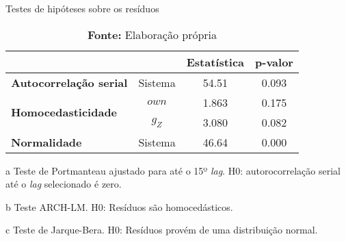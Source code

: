 \begin{table}[htb]
\centering
\caption{Testes de hipóteses sobre os resíduos}
\label{testes_resduos}
	\begin{threeparttable}
\begin{tabular}{l|c|c|c}
\hline
\multicolumn{2}{l|}{} & \textbf{Estatística} & \textbf{p-valor} \\ \hline
\textbf{Autocorrelação serial}\tnote{a} & Sistema & 54.51 & 0.093 \\ \hline
\multirow{2}{*}{\textbf{Homocedasticidade}\tnote{b}} & $own$ & 1.863 & 0.175 \\ \cline{2-4} 
 & $g_Z$ & 3.080 & 0.082 \\ \hline
\textbf{Normalidade}\tnote{c} & Sistema & 46.64 & 0.000 \\ \hline
\end{tabular}%
\begin{tablenotes}\footnotesize
	\item [a] Teste de Portmanteau ajustado para até o 15º \textit{lag}. H0: autorocorrelação serial até o \textit{lag} selecionado é zero.
	\item [b] Teste ARCH-LM. H0: Resíduos são homocedásticos.
	\item [c] Teste de Jarque-Bera. H0: Resíduos provém de uma distribuição normal.
\end{tablenotes}
\end{threeparttable}
\caption*{\textbf{Fonte:} Elaboração própria}
\end{table}